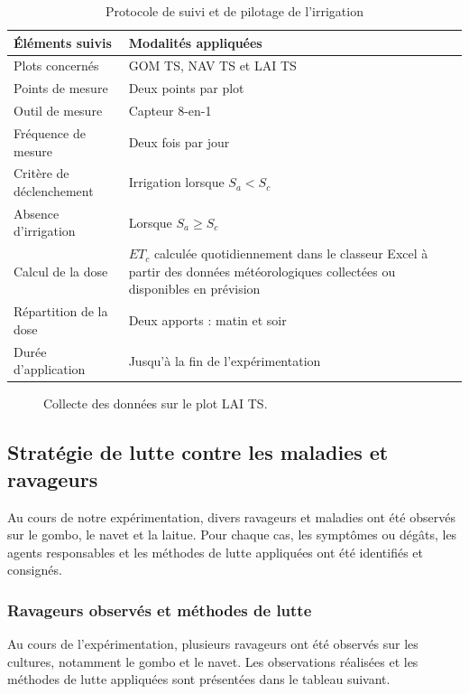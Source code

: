 \begin{table}[H]
    \centering
    \small
    \caption{Protocole de suivi et de pilotage de l'irrigation}
    \label{tab:pilotage_irrigation}
    \begin{tabular}{|p{4.2cm}|p{9.8cm}|}
        \hline
        \textbf{Éléments suivis} & \textbf{Modalités appliquées} \\
        \hline
        Plots concernés & GOM TS, NAV TS et LAI TS \\
        \hline
        Points de mesure & Deux points par plot \\
        \hline
        Outil de mesure & Capteur 8-en-1 \\
        \hline
        Fréquence de mesure & Deux fois par jour \\
        \hline
        Critère de déclenchement & Irrigation lorsque $S_a < S_c$ \\
        \hline
        Absence d'irrigation & Lorsque $S_a \geq S_c$ \\
        \hline
        Calcul de la dose & $ET_c$ calculée quotidiennement dans le classeur Excel à partir des données météorologiques collectées ou disponibles en prévision \\
        \hline
        Répartition de la dose & Deux apports : matin et soir \\
        \hline
        Durée d'application & Jusqu'à la fin de l'expérimentation \\
        \hline
    \end{tabular}
\end{table}

\begin{figure}[H]
    \centering
    \caption{Collecte des données sur le plot LAI TS. }
    \label{fig:collecte3}
\end{figure}

\subsection{Stratégie de lutte contre les maladies et ravageurs}
Au cours de notre expérimentation, divers ravageurs et maladies ont été observés sur le gombo, le navet et la laitue. Pour chaque cas, les symptômes ou dégâts, les agents responsables et les méthodes de lutte appliquées ont été identifiés et consignés.

\subsubsection{Ravageurs observés et méthodes de lutte}
Au cours de l’expérimentation, plusieurs ravageurs ont été observés sur les cultures, notamment le gombo et le navet. Les observations réalisées et les méthodes de lutte appliquées sont présentées dans le tableau suivant.

